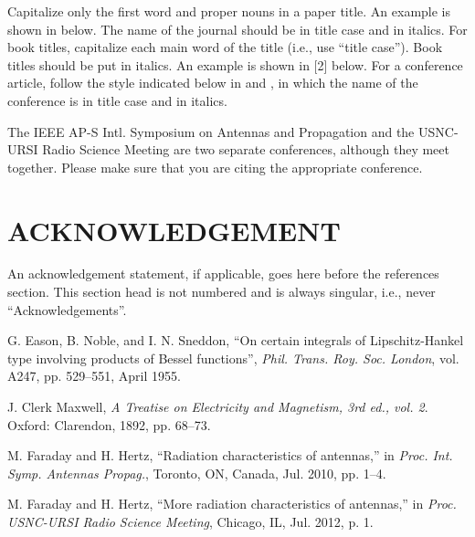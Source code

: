 \documentclass[]{NRSMRev}
\begin{document}
Capitalize only the first word and proper nouns in a paper title. An example is shown in \cite{article:eason} below. The name of the journal should be in title case and in italics. For book titles, capitalize each main word of the title (i.e., use ``title case''). Book titles should be put in italics. An example is shown in [2] below. For a conference article, follow the style indicated below in \cite{conf:faraday10} and \cite{conf:faraday12}, in which the name of the conference is in title case and in italics.

The IEEE AP-S Intl. Symposium on Antennas and Propagation and the USNC-URSI Radio Science Meeting are two separate conferences, although they meet together. Please make sure that you are citing the appropriate conference.

\section*{ACKNOWLEDGEMENT}
An acknowledgement statement, if applicable, goes here before the references section. This section head is not numbered and is always singular, i.e., never ``Acknowledgements''.



%
%
%
\begin{thebibliography}{1}

  G. Eason, B. Noble, and I. N. Sneddon, ``On certain integrals of Lipschitz-Hankel type involving products of Bessel functions'', \emph{Phil. Trans. Roy. Soc. London}, vol. A247, pp. 529--551, April 1955.
  
  J. Clerk Maxwell, \emph{A Treatise on Electricity and Magnetism, 3rd ed., vol. 2}. Oxford: Clarendon, 1892, pp. 68--73.
  
  M. Faraday and H. Hertz, ``Radiation characteristics of antennas,'' in \emph{Proc. Int. Symp. Antennas Propag.}, Toronto, ON, Canada, Jul. 2010, pp. 1–4.
  
  M. Faraday and H. Hertz, “More radiation characteristics of antennas,” in \emph{Proc. USNC-URSI Radio Science Meeting}, Chicago, IL, Jul. 2012, p. 1.

\end{thebibliography}
\end{document}
